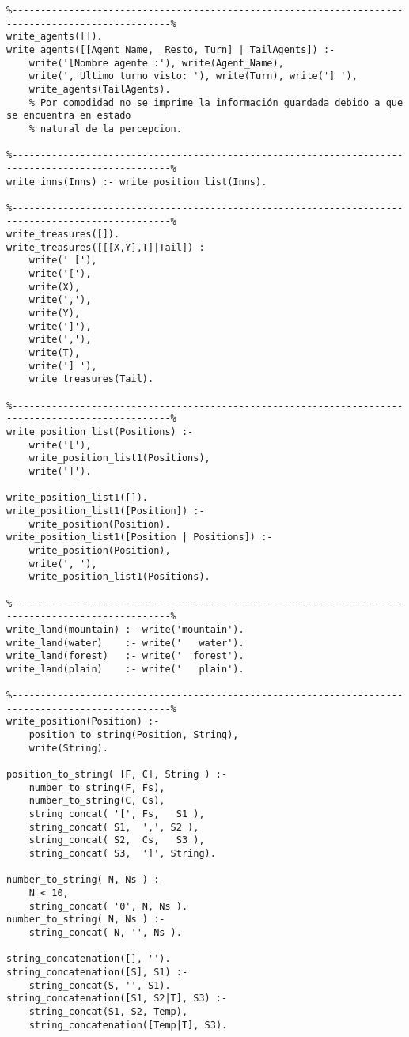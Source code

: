 \documentclass[a4paper,12pt]{report}
\begin{document}
\begin{scriptsize}
\begin{verbatim}
%--------------------------------------------------------------------------------------------------%
write_agents([]).
write_agents([[Agent_Name, _Resto, Turn] | TailAgents]) :-
    write('[Nombre agente :'), write(Agent_Name), 
    write(', Ultimo turno visto: '), write(Turn), write('] '), 
    write_agents(TailAgents).
    % Por comodidad no se imprime la información guardada debido a que se encuentra en estado 
    % natural de la percepcion.

%--------------------------------------------------------------------------------------------------%
write_inns(Inns) :- write_position_list(Inns).

%--------------------------------------------------------------------------------------------------%
write_treasures([]).
write_treasures([[[X,Y],T]|Tail]) :- 
    write(' ['), 
    write('['), 
    write(X), 
    write(','), 
    write(Y), 
    write(']'), 
    write(','), 
    write(T), 
    write('] '), 
    write_treasures(Tail).

%--------------------------------------------------------------------------------------------------%
write_position_list(Positions) :-
    write('['),
    write_position_list1(Positions),
    write(']').

write_position_list1([]).
write_position_list1([Position]) :-
    write_position(Position).
write_position_list1([Position | Positions]) :-
    write_position(Position), 
    write(', '), 
    write_position_list1(Positions).

%--------------------------------------------------------------------------------------------------%
write_land(mountain) :- write('mountain').
write_land(water)    :- write('   water').
write_land(forest)   :- write('  forest').
write_land(plain)    :- write('   plain').

%--------------------------------------------------------------------------------------------------%
write_position(Position) :-
    position_to_string(Position, String),
    write(String).
    
position_to_string( [F, C], String ) :-
    number_to_string(F, Fs),
    number_to_string(C, Cs),
    string_concat( '[', Fs,   S1 ),
    string_concat( S1,  ',', S2 ),
    string_concat( S2,  Cs,   S3 ),
    string_concat( S3,  ']', String).

number_to_string( N, Ns ) :-
    N < 10,
    string_concat( '0', N, Ns ).
number_to_string( N, Ns ) :-
    string_concat( N, '', Ns ).    

string_concatenation([], '').
string_concatenation([S], S1) :-
    string_concat(S, '', S1).
string_concatenation([S1, S2|T], S3) :-
    string_concat(S1, S2, Temp),
    string_concatenation([Temp|T], S3).


\end{verbatim}
\end{scriptsize}
\end{document}
